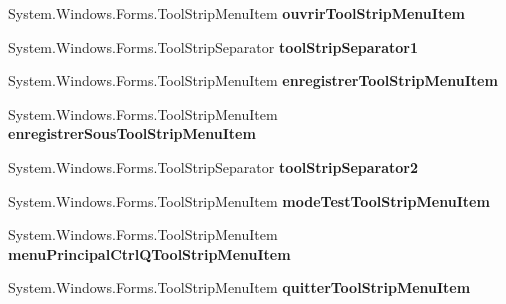 \begin{DoxyCompactItemize}
\item 
System.\+Windows.\+Forms.\+Tool\+Strip\+Menu\+Item {\bfseries ouvrir\+Tool\+Strip\+Menu\+Item}\hypertarget{class_interface_graphique_1_1_edition_aa09d43952a5b72f85f14598d986d5599}{}\label{class_interface_graphique_1_1_edition_aa09d43952a5b72f85f14598d986d5599}

\item 
System.\+Windows.\+Forms.\+Tool\+Strip\+Separator {\bfseries tool\+Strip\+Separator1}\hypertarget{class_interface_graphique_1_1_edition_a82a29602d483fb854b9ad5da2eee5799}{}\label{class_interface_graphique_1_1_edition_a82a29602d483fb854b9ad5da2eee5799}

\item 
System.\+Windows.\+Forms.\+Tool\+Strip\+Menu\+Item {\bfseries enregistrer\+Tool\+Strip\+Menu\+Item}\hypertarget{class_interface_graphique_1_1_edition_a1495085881b6800bac658dc9931a6df9}{}\label{class_interface_graphique_1_1_edition_a1495085881b6800bac658dc9931a6df9}

\item 
System.\+Windows.\+Forms.\+Tool\+Strip\+Menu\+Item {\bfseries enregistrer\+Sous\+Tool\+Strip\+Menu\+Item}\hypertarget{class_interface_graphique_1_1_edition_aaf9b8f8d30c4415185cf6d2050ab6e04}{}\label{class_interface_graphique_1_1_edition_aaf9b8f8d30c4415185cf6d2050ab6e04}

\item 
System.\+Windows.\+Forms.\+Tool\+Strip\+Separator {\bfseries tool\+Strip\+Separator2}\hypertarget{class_interface_graphique_1_1_edition_a353143463226d60ce355d372ffc6492a}{}\label{class_interface_graphique_1_1_edition_a353143463226d60ce355d372ffc6492a}

\item 
System.\+Windows.\+Forms.\+Tool\+Strip\+Menu\+Item {\bfseries mode\+Test\+Tool\+Strip\+Menu\+Item}\hypertarget{class_interface_graphique_1_1_edition_aeadd4740b317354a6b503bed6ea7a276}{}\label{class_interface_graphique_1_1_edition_aeadd4740b317354a6b503bed6ea7a276}

\item 
System.\+Windows.\+Forms.\+Tool\+Strip\+Menu\+Item {\bfseries menu\+Principal\+Ctrl\+Q\+Tool\+Strip\+Menu\+Item}\hypertarget{class_interface_graphique_1_1_edition_af2c0b47fb6627fd4aa4a937b8ac0c64e}{}\label{class_interface_graphique_1_1_edition_af2c0b47fb6627fd4aa4a937b8ac0c64e}

\item 
System.\+Windows.\+Forms.\+Tool\+Strip\+Menu\+Item {\bfseries quitter\+Tool\+Strip\+Menu\+Item}\hypertarget{class_interface_graphique_1_1_edition_ab330f8f09ba2b2687b8f7b229d5ab911}{}\label{class_interface_graphique_1_1_edition_ab330f8f09ba2b2687b8f7b229d5ab911}


\end{DoxyCompactItemize}
